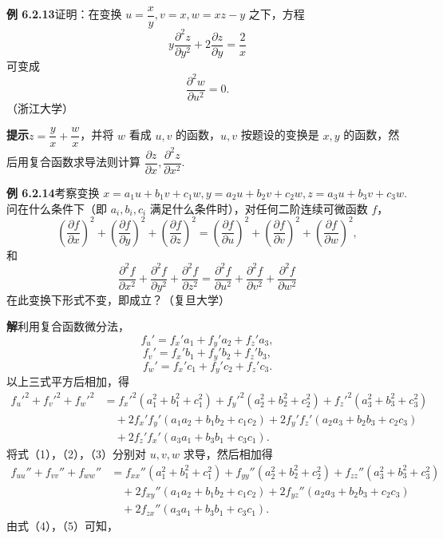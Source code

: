 \documentclass[UTF8, 12pt, fontset=fandol, oneside]{ctexart}
\begin{document}
\noindent\textbf{例 6.2.13}\quad 证明：在变换 $u=\dfrac{x}{y},v=x,w=xz-y$ 之下，方程
\[
  y\frac{\partial^2z}{\partial y^2}+2\frac{\partial z}{\partial y}=\frac2x
\]
可变成
\[
  \frac{\partial^2w}{\partial u^2}=0.
\]
（浙江大学）

\noindent\textbf{提示}\quad $z=\dfrac yx+\dfrac wx$，并将 $w$ 看成 $u,v$ 的函数，$u,v$ 按题设的变换是 $x,y$ 的函数，然后用复合函数求导法则计算 $\dfrac{\partial z}{\partial x},\dfrac{\partial^2z}{\partial x^2}$.

\noindent\textbf{例 6.2.14}\quad 考察变换 $x=a_1u+b_1v+c_1w,y=a_2u+b_2v+c_2w,z=a_3u+b_3v+c_3w$. 问在什么条件下（即 $a_i,b_i,c_i$ 满足什么条件时），对任何二阶连续可微函数 $f$，
\[
  \left(\frac{\partial f}{\partial x}\right)^2+
  \left(\frac{\partial f}{\partial y}\right)^2+
  \left(\frac{\partial f}{\partial z}\right)^2
  =
  \left(\frac{\partial f}{\partial u}\right)^2+
  \left(\frac{\partial f}{\partial v}\right)^2+
  \left(\frac{\partial f}{\partial w}\right)^2,
\]
和
\[
  \frac{\partial^2f}{\partial x^2}+\frac{\partial^2f}{\partial y^2}+\frac{\partial^2f}{\partial z^2}
  =
  \frac{\partial^2f}{\partial u^2}+\frac{\partial^2f}{\partial v^2}+\frac{\partial^2f}{\partial w^2}
\]
在此变换下形式不变，即成立？（复旦大学）

\noindent\textbf{解}\quad 利用复合函数微分法，
\[
  f_u'=f_x'a_1+f_y'a_2+f_z'a_3, \tag{1}
\]
\[
  f_v'=f_x'b_1+f_y'b_2+f_z'b_3, \tag{2}
\]
\[
  f_w'=f_x'c_1+f_y'c_2+f_z'c_3. \tag{3}
\]
以上三式平方后相加，得
\begin{equation}
\begin{aligned}
f_u'^2+f_v'^2+f_w'^2
&=f_x'^2(a_1^2+b_1^2+c_1^2)+f_y'^2(a_2^2+b_2^2+c_2^2)+f_z'^2(a_3^2+b_3^2+c_3^2)\\
&\quad+2f_x'f_y'(a_1a_2+b_1b_2+c_1c_2)
+2f_y'f_z'(a_2a_3+b_2b_3+c_2c_3)\\
&\quad+2f_z'f_x'(a_3a_1+b_3b_1+c_3c_1).
\end{aligned}
\tag{4}
\end{equation}
将式（1），（2），（3）分别对 $u,v,w$ 求导，然后相加得
\begin{equation}
\begin{aligned}
f_{uu}''+f_{vv}''+f_{ww}''
&=f_{xx}''(a_1^2+b_1^2+c_1^2)+f_{yy}''(a_2^2+b_2^2+c_2^2)+f_{zz}''(a_3^2+b_3^2+c_3^2)\\
&\quad+2f_{xy}''(a_1a_2+b_1b_2+c_1c_2)
+2f_{yz}''(a_2a_3+b_2b_3+c_2c_3)\\
&\quad+2f_{zx}''(a_3a_1+b_3b_1+c_3c_1).
\end{aligned}
\tag{5}
\end{equation}
由式（4），（5）可知，
\end{document}
